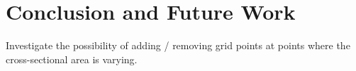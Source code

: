 \section{Conclusion and Future Work}\label{sec:conclusion}

Investigate the possibility of adding / removing grid points at points where the cross-sectional area is varying. 